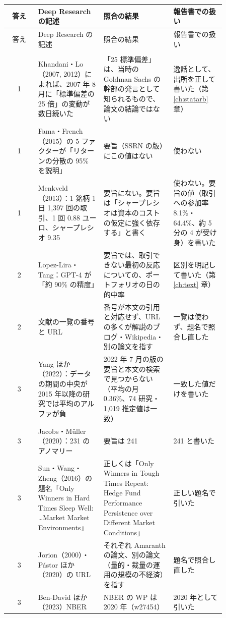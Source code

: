 {\small
\begin{longtable}{@{}cP{0.3\linewidth}P{0.32\linewidth}P{0.24\linewidth}@{}}
\toprule
答え & Deep Research の記述 & 照合の結果 & 報告書での扱い \\
\midrule
\endfirsthead
\toprule
答え & Deep Research の記述 & 照合の結果 & 報告書での扱い \\
\midrule
\endhead
\bottomrule
\endfoot
{} \\
1 & Khandani・Lo（2007, 2012）によれば、2007 年 8 月に「標準偏差の 25 倍」の変動が数日続いた & 「25 標準偏差」は、当時の Goldman Sachs の幹部の発言として知られるもので、論文の結論ではない & 逸話として、出所を正して書いた（第 \ref{ch:statarb} 章） \\
1 & Fama・French（2015）の 5 ファクターが「リターンの分散の 95\% を説明」 & 要旨（SSRN の版）にこの値はない & 使わない \\
1 & Menkveld（2013）：1 銘柄 1 日 1,397 回の取引、1 回 0.88 ユーロ、シャープレシオ 9.35 & 要旨にない。要旨は「シャープレシオは資本のコストの仮定に強く依存する」と書く & 使わない。要旨の値（取引への参加率 8.1\%・64.4\%、約 5 分の 4 が受け身）を書いた \\
2 & Lopez-Lira・Tang：GPT-4 が「約 90\% の精度」 & 要旨では、取引できない最初の反応についての、ポートフォリオの日の的中率 & 区別を明記して書いた（第 \ref{ch:text} 章） \\
2 & 文献の一覧の番号と URL & 番号が本文の引用と対応せず、URL の多くが解説のブログ・Wikipedia・別の論文を指す & 一覧は使わず、題名で照合し直した \\
3 & Yang ほか（2022）：データの期間の中央が 2015 年以降の研究では平均のアルファが負 & 2022 年 7 月の版の要旨と本文の検索で見つからない（平均の月 0.36\%、74 研究・1,019 推定値は一致） & 一致した値だけを書いた \\
3 & Jacobs・Müller（2020）：231 のアノマリー & 要旨は 241 & 241 と書いた \\
3 & Sun・Wang・Zheng（2016）の題名「Only Winners in Hard Times Sleep Well: \ldots Market Market Environments」 & 正しくは「Only Winners in Tough Times Repeat: Hedge Fund Performance Persistence over Different Market Conditions」 & 正しい題名で引いた \\
3 & Jorion（2000）・Pástor ほか（2020）の URL & それぞれ Amaranth の論文、別の論文（量的・裁量の運用の規模の不経済）を指す & 題名で照合し直した \\
3 & Ben-David ほか（2023）NBER & NBER の WP は 2020 年（w27454） & 2020 年として引いた \\

\end{longtable}}
